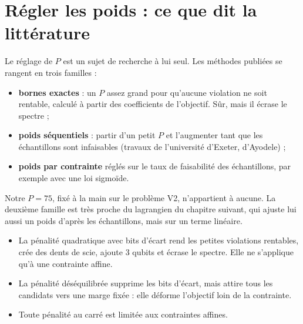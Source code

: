 \section{Régler les poids : ce que dit la littérature}
Le réglage de $P$ est un sujet de recherche à lui seul. Les méthodes publiées se rangent en trois familles :
\begin{itemize}
\item \textbf{bornes exactes} : un $P$ assez grand pour qu'aucune violation ne soit rentable, calculé à partir des coefficients de l'objectif. Sûr, mais il écrase le spectre ;
\item \textbf{poids séquentiels} : partir d'un petit $P$ et l'augmenter tant que les échantillons sont infaisables (travaux de l'université d'Exeter, d'Ayodele) ;
\item \textbf{poids par contrainte} réglés sur le taux de faisabilité des échantillons, par exemple avec une loi sigmoïde.
\end{itemize}
Notre $P=75$, fixé à la main sur le problème V2, n'appartient à aucune. La deuxième famille est très proche du lagrangien du chapitre suivant, qui ajuste lui aussi un poids d'après les échantillons, mais sur un terme linéaire.

\begin{resultat}
\begin{itemize}
\item La pénalité quadratique avec bits d'écart rend les petites violations rentables, crée des dents de scie, ajoute 3 qubits et écrase le spectre. Elle ne s'applique qu'à une contrainte affine.
\item La pénalité déséquilibrée supprime les bits d'écart, mais attire tous les candidats vers une marge fixée : elle déforme l'objectif loin de la contrainte.
\item Toute pénalité au carré est limitée aux contraintes affines.
\end{itemize}
\end{resultat}

